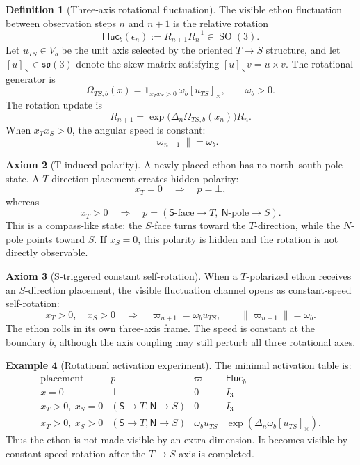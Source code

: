 \documentclass[11pt]{article}
\theoremstyle{definition}
\newtheorem{definition}{Definition}[section]
\newtheorem{axiom}[definition]{Axiom}
\newtheorem{example}[definition]{Example}
\theoremstyle{plain}
\newcommand{\Fluc}{\mathsf{Fluc}}
\newcommand{\Npole}{\mathsf N}
\newcommand{\Spole}{\mathsf S}
\newcommand{\defeq}{\mathrel{:=}}
\DeclareMathOperator{\SO}{SO}
\begin{document}
\begin{definition}[Three-axis rotational fluctuation]
The visible ethon fluctuation between observation steps \(n\) and \(n+1\)
is the relative rotation
\[
  \Fluc_b(\epsilon_n)
  \defeq
  R_{n+1}R_n^{-1}
  \in\SO(3).
\]
Let \(u_{TS}\in V_b\) be the unit axis selected by the oriented
\(T\to S\) structure, and let \([u]_\times\in\mathfrak{so}(3)\) denote
the skew matrix satisfying \([u]_\times v=u\times v\).  The rotational
generator is
\[
  \Omega_{TS,b}(x)
  =
  \mathbf 1_{x_Tx_S>0}\,\omega_b [u_{TS}]_\times,
  \qquad
  \omega_b>0.
\]
The rotation update is
\[
  R_{n+1}
  =
  \exp\!\bigl(\Delta_n\Omega_{TS,b}(x_n)\bigr)R_n.
\]
When \(x_Tx_S>0\), the angular speed is constant:
\[
  \|\varpi_{n+1}\|=\omega_b.
\]
\end{definition}

\begin{axiom}[T-induced polarity]
A newly placed ethon has no north--south pole state.  A \(T\)-direction
placement creates hidden polarity:
\[
  x_T=0
  \quad\Rightarrow\quad
  p=\bot,
\]
whereas
\[
  x_T>0
  \quad\Rightarrow\quad
  p=
  (\Spole\text{-face}\to T,\ \Npole\text{-pole}\to S).
\]
This is a compass-like state: the \(S\)-face turns toward the
\(T\)-direction, while the \(N\)-pole points toward \(S\).  If
\(x_S=0\), this polarity is hidden and the rotation is not directly
observable.
\end{axiom}

\begin{axiom}[S-triggered constant self-rotation]
When a \(T\)-polarized ethon receives an \(S\)-direction placement, the
visible fluctuation channel opens as constant-speed self-rotation:
\[
  x_T>0,\quad x_S>0
  \quad\Rightarrow\quad
  \varpi_{n+1}=\omega_bu_{TS},
  \qquad
  \|\varpi_{n+1}\|=\omega_b.
\]
The ethon rolls in its own three-axis frame.  The speed is constant at
the boundary \(b\), although the axis coupling may still perturb all
three rotational axes.
\end{axiom}

\begin{example}[Rotational activation experiment]
The minimal activation table is:
\[
\begin{array}{c|c|c|c}
\text{placement} & p & \varpi & \Fluc_b\\
\hline
x=0 & \bot & 0 & I_3\\
x_T>0,\ x_S=0
  & (\Spole\to T,\Npole\to S) & 0 & I_3\\
x_T>0,\ x_S>0
  & (\Spole\to T,\Npole\to S) & \omega_bu_{TS}
  & \exp(\Delta_n\omega_b[u_{TS}]_\times).
\end{array}
\]
Thus the ethon is not made visible by an extra dimension.  It becomes
visible by constant-speed rotation after the \(T\to S\) axis is
completed.
\end{example}
\end{document}

